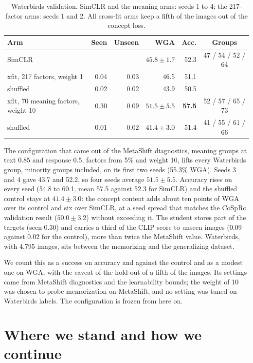 \documentclass{article}
\begin{document}
\begin{table}[h]
\centering
\caption{Waterbirds validation. SimCLR and the meaning arms: seeds 1 to 4; the 217-factor arms: seeds 1
and 2. All cross-fit arms keep a fifth of the images out of the concept loss.}
\label{tab:waterbirds}
\small
\begin{tabular}{l r r r r c}
\toprule
Arm & Seen & Unseen & WGA & Acc. & Groups \\
\midrule
SimCLR & & & $45.8\pm1.7$ & 52.3 & 47 / 54 / 52 / 64 \\
xfit, 217 factors, weight 1 & 0.04 & 0.03 & 46.5 & 51.1 & \\
\quad shuffled & 0.02 & 0.02 & 43.9 & 50.5 & \\
xfit, 70 meaning factors, weight 10 & 0.30 & 0.09 & $\mathbf{51.5\pm5.5}$ & \textbf{57.5} & 52 / 57 / 65 / 73 \\
\quad shuffled & 0.01 & 0.02 & $41.4\pm3.0$ & 51.4 & 41 / 55 / 61 / 66 \\
\bottomrule
\end{tabular}
\end{table}

The configuration that came out of the MetaShift diagnostics, meaning groups at text 0.85 and
response 0.5, factors from 5\% and weight 10, lifts every Waterbirds group, minority groups included,
on its first two seeds (55.3\% WGA). Seeds 3 and 4 gave 43.7 and 52.2, so four seeds average
$51.5\pm5.5$. Accuracy rises on every seed (54.8 to 60.1, mean 57.5 against 52.3 for SimCLR) and the
shuffled control stays at $41.4\pm3.0$: the concept content adds about ten points of WGA over its
control and six over SimCLR, at a seed spread that matches the CoSpRo validation result
($50.0\pm3.2$) without exceeding it. The student stores part of
the targets (seen 0.30) and carries a third of the CLIP score to unseen images (0.09 against 0.02 for
the control), more than twice the MetaShift value. Waterbirds, with 4,795 images, sits between the
memorizing and the generalizing dataset.

We count this as a success on accuracy and against the control and as a modest one on WGA, with the
caveat of the hold-out of a fifth of the images. Its settings came from MetaShift
diagnostics and the learnability bounds; the weight of 10 was chosen to probe memorization on
MetaShift, and no setting was tuned on Waterbirds labels. The configuration is frozen from here on.

\section{Where we stand and how we continue}
\label{sec:next}
\end{document}
